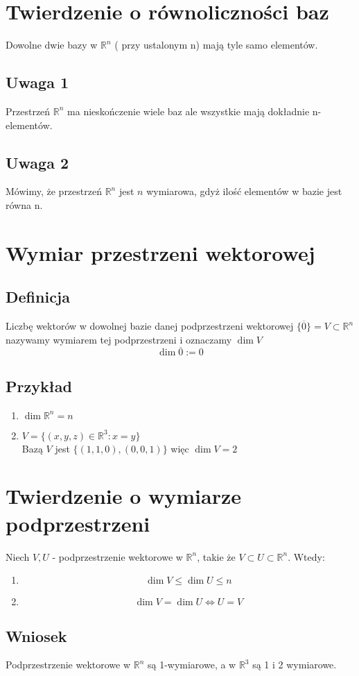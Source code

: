 \documentclass[11pt]{article}
\begin{document}
\section{Twierdzenie o równoliczności baz}
Dowolne dwie bazy w $\mathbb{R}^n$ ( przy ustalonym n) mają tyle samo elementów. 
\subsection{Uwaga 1}
Przestrzeń $\mathbb{R}^n$ ma nieskończenie wiele baz ale wszystkie mają dokładnie n-elementów.
\subsection{Uwaga 2}
Mówimy, że przestrzeń $\mathbb{R}^n$ jest $n$ wymiarowa, gdyż ilość elementów w bazie jest równa n.
\section{Wymiar przestrzeni wektorowej}
\subsection{Definicja}
Liczbę wektorów w dowolnej bazie danej podprzestrzeni wektorowej $\{ \overline{0} \} = V \subset \mathbb{R}^n$ nazywamy wymiarem tej podprzestrzeni i oznaczamy $\dim{V}$
$$ \dim{\overline{0}} := 0$$
\subsection{Przykład}
\begin{enumerate}
\item{$\dim{\mathbb{R}^n} = n$}
\item{$V = \{ (x,y,z) \in \mathbb{R}^3 : x = y \}$ \\
Bazą $V$ jest $\{(1,1,0),(0,0,1)\}$ więc $\dim{V} = 2$}
\end{enumerate}
\section{Twierdzenie o wymiarze podprzestrzeni}
Niech $V,U$ - podprzestrzenie wektorowe w $\mathbb{R}^n$, takie że $ V \subset U \subset \mathbb{R}^n$. Wtedy:
\begin{enumerate}
\item{$$\dim{V} \leq \dim{U} \leq n$$}
\item{$$\dim{V} = \dim{U} \iff U = V$$}
\end{enumerate}
\subsection{Wniosek}
Podprzestrzenie wektorowe w $\mathbb{R}^n$ są 1-wymiarowe, a w $\mathbb{R}^3$ są 1 i 2 wymiarowe.
\end{document}
